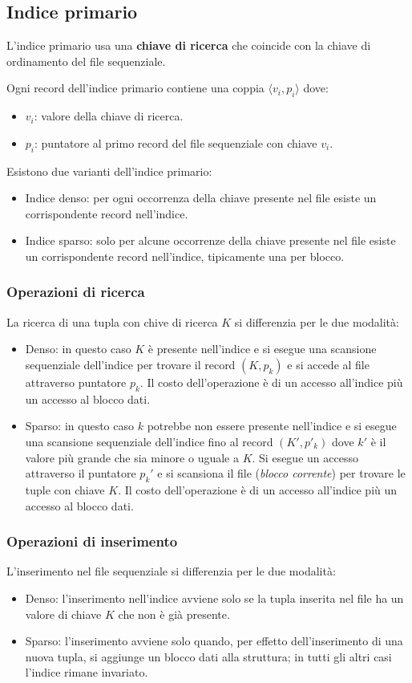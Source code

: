 \documentclass[oneside,a4paper,11pt]{book}
\theoremstyle{italicstyle}
\theoremstyle{normStyle}
\begin{document}
\subsection{Indice primario}
L'indice primario usa una \textbf{chiave di ricerca} che coincide con la chiave di 
ordinamento del file sequenziale.

Ogni record dell'indice primario contiene una coppia $\langle v_i, p_i\rangle$ dove:
\begin{itemize}
    \item $v_i$: valore della chiave di ricerca.
    \item $p_i$: puntatore al primo record del file sequenziale con chiave $v_i$.
\end{itemize}
Esistono due varianti dell'indice primario:
\begin{itemize}
    \item Indice denso: per ogni occorrenza della chiave presente nel file esiste 
    un corrispondente record nell'indice.
    \item Indice sparso: solo per alcune occorrenze della chiave presente nel file 
    esiste un corrispondente record nell'indice, tipicamente una per blocco.
\end{itemize}
\subsubsection{Operazioni di ricerca}
La ricerca di una tupla con chive di ricerca $K$ si differenzia per le due 
modalità:
\begin{itemize}
    \item Denso: in questo caso $K$ è presente nell'indice e si esegue una scansione 
    sequenziale dell'indice per trovare il record $(K, p_k)$ e si accede al file 
    attraverso puntatore $p_k$. Il costo dell'operazione è di un accesso all'indice più 
    un accesso al blocco dati.
    \item Sparso: in questo caso $k$ potrebbe non essere presente nell'indice e si 
    esegue una scansione sequenziale dell'indice fino al record $(K',p'_k)$ dove $k'$ 
    è il valore più grande che sia minore o uguale a $K$. Si esegue un accesso attraverso 
    il puntatore $p_k'$ e si scansiona il file (\textit{blocco corrente}) per trovare 
    le tuple con chiave $K$. Il costo dell'operazione è di un accesso all'indice più 
    un accesso al blocco dati.
\end{itemize}
\subsubsection{Operazioni di inserimento}
L'inserimento nel file sequenziale si differenzia per le due modalità:
\begin{itemize}
    \item Denso: l'inserimento nell'indice avviene solo se la tupla inserita nel file ha
    un valore di chiave $K$ che non è già presente.
    \item Sparso: l'inserimento avviene solo quando, per effetto dell'inserimento di 
    una nuova tupla, si aggiunge un blocco dati alla struttura; in tutti gli altri 
    casi l'indice rimane invariato.
\end{itemize}
\end{document}
